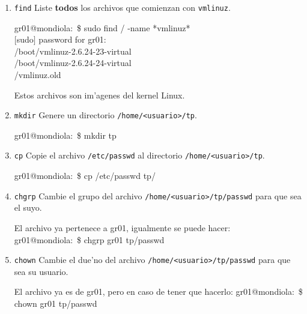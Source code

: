 \begin{enumerate}

\item \texttt{find} Liste \textbf{todos} los archivos que comienzan con \texttt{vmlinuz}.

\begin{envRespuesta}
gr01@mondiola:~\$ sudo find / -name *vmlinuz* \\
$[$sudo$]$ password for gr01: \\
/boot/vmlinuz-2.6.24-23-virtual\\
/boot/vmlinuz-2.6.24-24-virtual\\
/vmlinuz.old
\end{envRespuesta}

Estos archivos son im'agenes del kernel Linux.

\item \texttt{mkdir} Genere un directorio \texttt{/home/<usuario>/tp}.

\begin{envRespuesta}
gr01@mondiola:~\$ mkdir tp
\end{envRespuesta}

\item \texttt{cp} Copie el archivo \texttt{/etc/passwd} al directorio \texttt{/home/<usuario>/tp}.

\begin{envRespuesta}
gr01@mondiola:~\$ cp /etc/passwd tp/
\end{envRespuesta}

\item \texttt{chgrp} Cambie el grupo del archivo \texttt{/home/<usuario>/tp/passwd} para que sea el suyo.

\begin{envRespuesta}
El archivo ya pertenece a gr01, igualmente se puede hacer:\\
gr01@mondiola:~\$ chgrp gr01 tp/passwd
\end{envRespuesta}

\item \texttt{chown} Cambie el due'no del archivo \texttt{/home/<usuario>/tp/passwd} para que sea su usuario.

\begin{envRespuesta}
El archivo ya es de gr01, pero en caso de tener que hacerlo:
gr01@mondiola:~\$ chown gr01 tp/passwd
\end{envRespuesta}


\end{enumerate}
